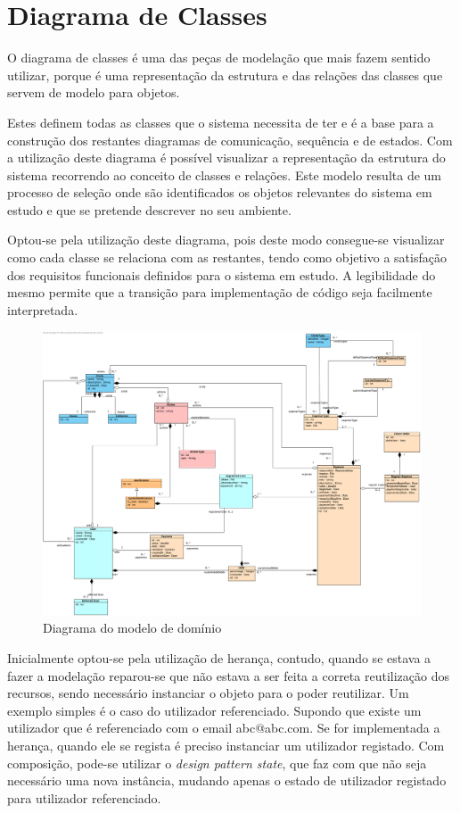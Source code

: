 \section{Diagrama de Classes}

O diagrama de classes é uma das peças de modelação que mais fazem sentido utilizar, porque é uma representação da estrutura e das relações das classes que servem de modelo para objetos.

Estes definem todas as classes que o sistema necessita de ter e é a base para a construção dos restantes diagramas de comunicação, sequência e de estados.
Com a utilização deste diagrama é possível visualizar a representação da estrutura do sistema recorrendo ao conceito de classes e relações. Este modelo resulta de um processo de seleção onde são identificados os objetos relevantes do sistema em estudo e que se pretende descrever no seu ambiente.

Optou-se pela utilização deste diagrama, pois deste modo consegue-se visualizar como cada classe se relaciona com as restantes, tendo como objetivo a satisfação dos requisitos funcionais definidos para o sistema em estudo. A legibilidade do mesmo permite que a transição para implementação de código seja facilmente interpretada.

\begin{figure}[H]
\centerline{\includegraphics[width=1\textwidth]{images/modeling/diagramaClasses}}
\caption{Diagrama do modelo de domínio}
\label{fig:classDiagram}
\end{figure}

Inicialmente optou-se pela utilização de herança, contudo, quando se estava a fazer a modelação reparou-se que não estava a ser feita a correta reutilização dos recursos, sendo necessário instanciar o objeto para o poder reutilizar. Um exemplo simples é o caso do utilizador referenciado. Supondo que existe um utilizador que é referenciado com o email abc@abc.com. Se for implementada a herança, quando ele se regista é preciso instanciar um utilizador registado. Com composição, pode-se utilizar o \textit{design pattern state}, que faz com que não seja necessário uma nova instância, mudando apenas o estado de utilizador registado para utilizador referenciado.

